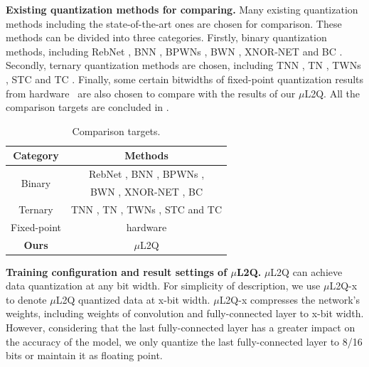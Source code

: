 \textbf{Existing quantization methods for comparing.}
Many existing quantization methods including the state-of-the-art ones are chosen for comparison.
These methods can be divided into three categories. 
Firstly, binary quantization methods, including RebNet \citep{ghasemzadeh2018rebnet}, BNN \citep{BitwiseNN}, BPWNs \citep{TWNs}, BWN \citep{rastegari2016xnor}, XNOR-NET \citep{rastegari2016xnor} and BC \citep{Binaryconnect}. 
Secondly, ternary quantization methods are chosen, including TNN \citep{alemdar2017ternary}, TN \citep{TrueNorth1}, TWNs \citep{TWNs}, STC \citep{jin2018sparse} and TC \citep{Ternaryconnect}. 
Finally, some certain bitwidths of fixed-point quantization results from hardware~\cite{gysel2016hardware} are also chosen to compare with the results of our $\mu$L2Q. 
All the comparison targets are concluded in .
\begin{table}[]
    \centering
    \caption{Comparison targets.}
    \label{tab:comparisionmethods}
    \begin{tabular}{c|c}
        \hline
        Category & Methods \\\hline
        \multirow{2}{*}{Binary} & RebNet \citep{ghasemzadeh2018rebnet}, BNN \citep{BitwiseNN}, BPWNs \citep{TWNs}, \\
                & BWN \citep{rastegari2016xnor}, XNOR-NET \citep{rastegari2016xnor}, BC \citep{Binaryconnect}\\\hline
        Ternary & TNN \citep{alemdar2017ternary}, TN \citep{TrueNorth1}, TWNs \citep{TWNs}, STC \citep{jin2018sparse} and TC \citep{Ternaryconnect} \\\hline
        Fixed-point& hardware \cite{gysel2016hardware}\\\hline
        \textbf{Ours}&$\mu$L2Q\\\hline
    \end{tabular}
\end{table}

\textbf{Training configuration and result settings of $\mu$L2Q.} 
$\mu$L2Q can achieve data quantization at any bit width. 
For simplicity of description, we use $\mu$L2Q-x to denote $\mu$L2Q quantized data at x-bit width.
$\mu$L2Q-x compresses the network's weights, including weights of convolution and fully-connected layer to x-bit width. 
However, considering that the last fully-connected layer has a greater impact on the accuracy of the model, we only quantize the last fully-connected layer to 8/16 bits or maintain it as floating point.

